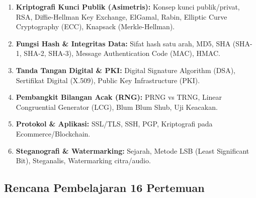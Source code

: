 \documentclass[12pt,a4paper]{article}
\begin{document}
\begin{enumerate}[leftmargin=*]
\begin{itemize}
    \end{itemize}
  \item \textbf{Kriptografi Kunci Publik (Asimetris):} Konsep kunci publik/privat, RSA, Diffie-Hellman Key Exchange, ElGamal, Rabin, Elliptic Curve Cryptography (ECC), Knapsack (Merkle-Hellman).
  \item \textbf{Fungsi Hash \& Integritas Data:} Sifat hash satu arah, MD5, SHA (SHA-1, SHA-2, SHA-3), Message Authentication Code (MAC), HMAC.
  \item \textbf{Tanda Tangan Digital \& PKI:} Digital Signature Algorithm (DSA), Sertifikat Digital (X.509), Public Key Infrastructure (PKI).
  \item \textbf{Pembangkit Bilangan Acak (RNG):} PRNG vs TRNG, Linear Congruential Generator (LCG), Blum Blum Shub, Uji Keacakan.
  \item \textbf{Protokol \& Aplikasi:} SSL/TLS, SSH, PGP, Kriptografi pada E\-commerce/Blockchain.
  \item \textbf{Steganografi \& Watermarking:} Sejarah, Metode LSB (Least Significant Bit), Steganalis, Watermarking citra/audio.
\end{enumerate}

\subsection*{Rencana Pembelajaran 16 Pertemuan}
\end{document}
